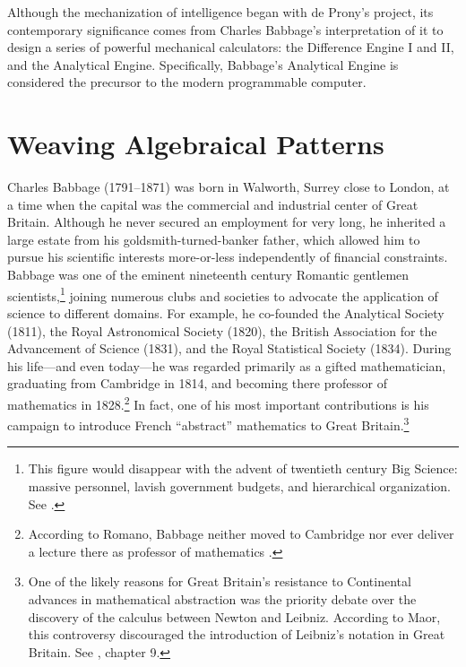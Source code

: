 \documentclass[version=last,draft=false,paper=A4,portrait,twoside=true,twocolumn=false,headinclude=false,footinclude=false,fontsize=12,BCOR=20mm,DIV=calc,pagesize=auto,titlepage=firstiscover,mpinclude=false,open=right,chapterprefix=true,numbers=autoendperiod,headsepline=false,headings=twolinechapter,parskip=false]{scrbook}
\begin{document}
Although the mechanization of intelligence began with de Prony's project,
its contemporary significance comes from Charles Babbage's interpretation
of it to design a series of powerful mechanical calculators: the Difference
Engine I and II, and the Analytical Engine. Specifically, Babbage's
Analytical Engine is considered the precursor to the modern programmable
computer.

\section{Weaving Algebraical Patterns}
\label{sec:org4430d83}

Charles Babbage (1791--1871) was born in Walworth, Surrey close to London,
at a time when the capital was the commercial and industrial center of
Great Britain. Although he never secured an employment for very long, he
inherited a large estate from his goldsmith-turned-banker father, which
allowed him to pursue his scientific interests more-or-less independently
of financial constraints. Babbage was one of the eminent nineteenth century
Romantic gentlemen scientists,\footnote{This figure would disappear with the advent of twentieth century
Big Science: massive personnel, lavish government budgets, and hierarchical
organization. See \textcite{mirowski2011}.} joining numerous clubs and societies
to advocate the application of science to different domains. For example,
he co-founded the Analytical Society (1811), the Royal Astronomical Society
(1820), the British Association for the Advancement of Science (1831), and
the Royal Statistical Society (1834). During his life---and even today---he
was regarded primarily as a gifted mathematician, graduating from Cambridge
in 1814, and becoming there professor of mathematics in 1828.\footnote{According to Romano, Babbage neither moved to Cambridge nor ever
deliver a lecture there as professor of mathematics
\autocite[387]{romano1982}.} In
fact, one of his most important contributions is his campaign to introduce
French ``abstract'' mathematics to Great Britain.\footnote{One of the likely reasons for Great Britain's resistance to
Continental advances in mathematical abstraction was the priority debate
over the discovery of the calculus between Newton and Leibniz. According to
Maor, this controversy discouraged the introduction of Leibniz's notation
in Great Britain. See \textcite{maor1994}, chapter 9.}
\end{document}
